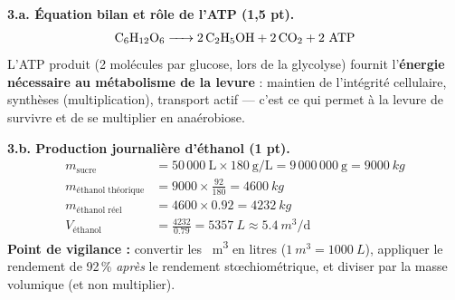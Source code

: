 \documentclass[11pt]{article}
\begin{document}
\begin{corrige}
\textbf{3.a. Équation bilan et rôle de l'ATP (1,5 pt).}
\[ \ce{C6H12O6 -> 2 C2H5OH + 2 CO2} + 2\ \text{ATP} \]
L'ATP produit (2 molécules par glucose, lors de la glycolyse) fournit l'\textbf{énergie nécessaire au métabolisme de la levure} : maintien de l'intégrité cellulaire, synthèses (multiplication), transport actif — c'est ce qui permet à la levure de survivre et de se multiplier en anaérobiose.

\textbf{3.b. Production journalière d'éthanol (1 pt).}
\begin{align*}
m_{\text{sucre}} &= 50\,000\ \text{L} \times 180\ \text{g/L} = 9\,000\,000\ \text{g} = \SI{9000}{kg} \\
m_{\text{éthanol théorique}} &= 9000 \times \frac{92}{180} = \SI{4600}{kg} \\
m_{\text{éthanol réel}} &= 4600 \times \num{0,92} = \SI{4232}{kg} \\
V_{\text{éthanol}} &= \frac{4232}{\num{0,79}} = \SI{5357}{L} \approx \SI{5,4}{m^3\per\day}
\end{align*}
\textbf{Point de vigilance :} convertir les \SI{}{m^3} en litres ($\SI{1}{m^3} = \SI{1000}{L}$), appliquer le rendement de 92\,\% \emph{après} le rendement stœchiométrique, et diviser par la masse volumique (et non multiplier).
\end{corrige}
\end{document}
